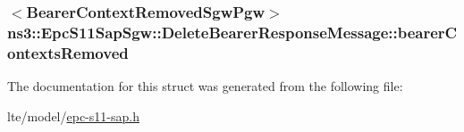 \subsubsection[{\texorpdfstring{bearer\+Contexts\+Removed}{bearerContextsRemoved}}]{$<${\bf Bearer\+Context\+Removed\+Sgw\+Pgw}$>$ ns3\+::\+Epc\+S11\+Sap\+Sgw\+::\+Delete\+Bearer\+Response\+Message\+::bearer\+Contexts\+Removed}\hypertarget{structns3_1_1EpcS11SapSgw_1_1DeleteBearerResponseMessage_ab69c171c5dabf9d08da798d2268cf3c9}{}\label{structns3_1_1EpcS11SapSgw_1_1DeleteBearerResponseMessage_ab69c171c5dabf9d08da798d2268cf3c9}


The documentation for this struct was generated from the following file\+:\begin{DoxyCompactItemize}
\item 
lte/model/\hyperlink{epc-s11-sap_8h}{epc-\/s11-\/sap.\+h}\end{DoxyCompactItemize}
